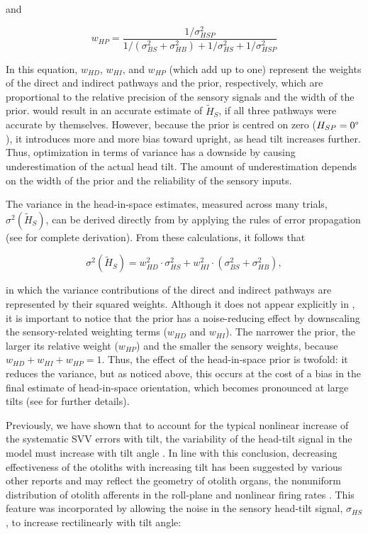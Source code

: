 and

\begin{equation}
\label{p1:eqn9}
w_{HP} = \frac{1 / \sigma^2_{HSP}}{1 / (\sigma^2_{BS} + \sigma^2_{HB}) + 1/\sigma^2_{HS} + 1/\sigma^2_{HSP}}
\end{equation}

In this equation, $w_{HD}$, $w_{HI}$, and $w_{HP}$ (which add up to one) represent the weights of the direct and indirect pathways and the prior, respectively, which are proportional to the relative precision of the sensory signals and the width of the prior.  would result in an accurate estimate of $\tilde{H}_S$, if all three pathways were accurate by themselves. However, because the prior is centred on zero ($H_{SP} = 0\degree$), it introduces more and more bias toward upright, as head tilt increases further. Thus, optimization in terms of variance has a downside by causing underestimation of the actual head tilt. The amount of underestimation depends on the width of the prior and the reliability of the sensory inputs.

The variance in the head-in-space estimates, measured across many trials, $\sigma^2(\tilde{H}_S)$, can be derived directly from  by applying the rules of error propagation (see  for complete derivation). From these calculations, it follows that

\begin{equation}
\label{p1:eqn10}
\sigma^2(\tilde{H}_{S}) = w^2_{HD} \cdot \sigma^2_{HS} + w^2_{HI} \cdot (\sigma^2_{BS} + \sigma^2_{HB}),
\end{equation}

in which the variance contributions of the direct and indirect pathways are represented by their squared weights. Although it does not appear explicitly in , it is important to notice that the prior has a noise-reducing effect by downscaling the sensory-related weighting terms ($w_{HD}$ and $w_{HI}$). The narrower the prior, the larger its relative weight ($w_{HP}$) and the smaller the sensory weights, because $w_{HD} + w_{HI} + w_{HP} = 1$. Thus, the effect of the head-in-space prior is twofold: it reduces the variance, but as noticed above, this occurs at the cost of a bias in the final estimate of head-in-space orientation, which becomes pronounced at large tilts (see  for further details).

Previously, we have shown that to account for the typical nonlinear increase of the systematic SVV errors with tilt, the variability of the head-tilt signal in the model must increase with tilt angle \cite{devrijer2008,devrijer2009}. In line with this conclusion, decreasing effectiveness of the otoliths with increasing tilt has been suggested by various other reports \cite{schone1968,tarnutzer2009,tarnutzer2010} and may reflect the geometry of otolith organs, the nonuniform distribution of otolith afferents in the roll-plane and nonlinear firing rates \cite{tarnutzer2010}. This feature was incorporated by allowing the noise in the sensory head-tilt signal, $\sigma_{HS}$, to increase rectilinearly with tilt angle:


